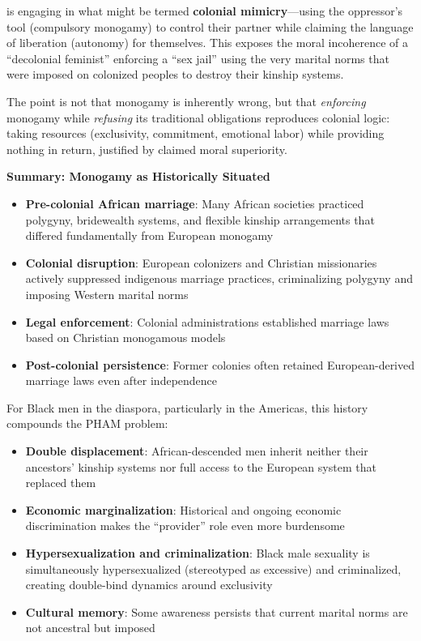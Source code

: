 \documentclass[12pt, letterpaper]{article}
\begin{document}
\noindent is engaging in what might be termed \textbf{colonial mimicry}---using the oppressor's tool (compulsory monogamy) to control their partner while claiming the language of liberation (autonomy) for themselves. This exposes the moral incoherence of a ``decolonial feminist'' enforcing a ``sex jail'' using the very marital norms that were imposed on colonized peoples to destroy their kinship systems.

The point is not that monogamy is inherently wrong, but that \textit{enforcing} monogamy while \textit{refusing} its traditional obligations reproduces colonial logic: taking resources (exclusivity, commitment, emotional labor) while providing nothing in return, justified by claimed moral superiority.

\textbf{Summary: Monogamy as Historically Situated}

\begin{itemize}
    \item \textbf{Pre-colonial African marriage}: Many African societies practiced polygyny, bridewealth systems, and flexible kinship arrangements that differed fundamentally from European monogamy
    \item \textbf{Colonial disruption}: European colonizers and Christian missionaries actively suppressed indigenous marriage practices, criminalizing polygyny and imposing Western marital norms
    \item \textbf{Legal enforcement}: Colonial administrations established marriage laws based on Christian monogamous models
    \item \textbf{Post-colonial persistence}: Former colonies often retained European-derived marriage laws even after independence
\end{itemize}

For Black men in the diaspora, particularly in the Americas, this history compounds the PHAM problem:

\begin{itemize}
    \item \textbf{Double displacement}: African-descended men inherit neither their ancestors' kinship systems nor full access to the European system that replaced them
    \item \textbf{Economic marginalization}: Historical and ongoing economic discrimination makes the ``provider'' role even more burdensome
    \item \textbf{Hypersexualization and criminalization}: Black male sexuality is simultaneously hypersexualized (stereotyped as excessive) and criminalized, creating double-bind dynamics around exclusivity
    \item \textbf{Cultural memory}: Some awareness persists that current marital norms are not ancestral but imposed
\end{itemize}
\end{document}
